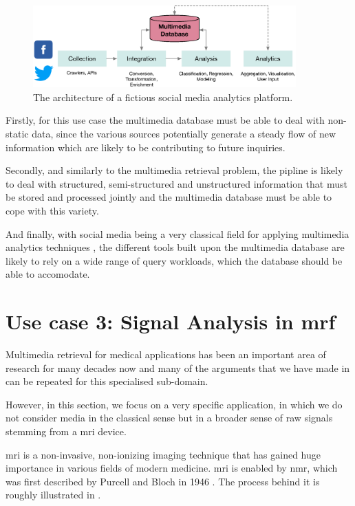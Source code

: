 \begin{figure}[tb]
    \centering
    \includegraphics[width=0.90\textwidth]{figures/social-media-architecture.eps}
    \caption{The architecture of a fictious social media analytics platform.}
    \label{figure:social-media}
\end{figure}

Firstly, for this use case the multimedia database must be able to deal with non-static data, since the various sources potentially generate a steady flow of new information which are likely to be contributing to future inquiries.

Secondly, and similarly to the multimedia retrieval problem, the pipline is likely to deal with structured, semi-structured and unstructured information that must be stored and processed jointly and the multimedia database must be able to cope with this variety. 

And finally, with social media being a very classical field for applying multimedia analytics techniques \cite{Pouyanfar:2018,Jonson:2016}, the different tools built upon the multimedia database are likely to rely on a wide range of query workloads, which the database should be able to accomodate.

\section{Use case 3: Signal Analysis in \acrshort{mrf}}
\label{section:application_mrf}

Multimedia retrieval for medical applications has been an important area of research for many decades now \cite{Mueller:2017Retrieval,Mueller:2004Review} and many of the arguments that we have made in  can be repeated for this specialised sub-domain.

However, in this section, we focus on a very specific application, in which we do not consider media in the classical sense but in a broader sense of raw signals stemming from a \acrfull{mri} device.

\acrshort{mri} is a non-invasive, non-ionizing imaging technique that has gained huge importance in various fields of modern medicine. \acrshort{mri} is enabled by \acrfull{nmr}, which was first described by Purcell and Bloch in 1946 \cite{Bloch:1946Nuclear,Purcell:1946Resonance}. The process behind it is roughly illustrated in .

